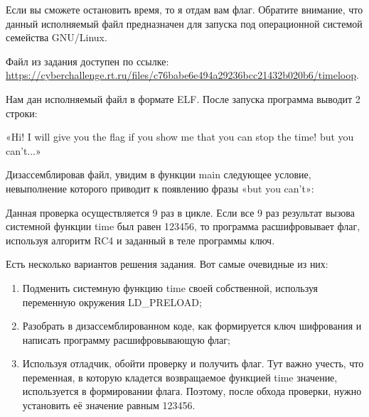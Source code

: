 
Если вы сможете остановить время, то я отдам вам флаг.
Обратите внимание, что данный исполняемый файл предназначен для запуска под операционной системой семейства GNU/Linux.

Файл из задания доступен по ссылке: \url{https://cyberchallenge.rt.ru/files/c76babe6e494a29236bcc21432b020b6/timeloop}.

\solutionSection

Нам дан исполняемый файл в формате ELF. После запуска программа выводит 2 строки:

«Hi! I will give you the flag if you show me that you can stop the time! but you can't...»

Дизассемблировав файл, увидим в функции main следующее условие, невыполнение которого приводит к появлению фразы «but you can’t»:


Данная проверка осуществляется 9 раз в цикле. Если все 9 раз результат вызова системной функции time был равен 123456, то программа расшифровывает флаг, используя алгоритм RC4 и заданный в теле программы ключ.

Есть несколько вариантов решения задания. Вот самые очевидные из них:

\begin{enumerate}
        \item Подменить системную функцию time своей собственной, используя переменную окружения LD\_PRELOAD;
        \item Разобрать в дизассемблированном коде, как формируется ключ шифрования и написать программу расшифровывающую флаг;
        \item Используя отладчик, обойти проверку и получить флаг. Тут важно учесть, что переменная, в которую кладется возвращаемое функцией time значение, используется в формировании флага. Поэтому, после обхода проверки, нужно установить её значение равным 123456.
\end{enumerate}

